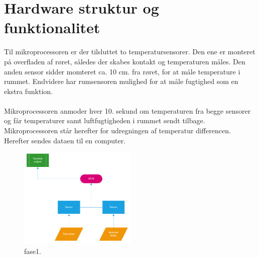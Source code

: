 \section{Hardware struktur og funktionalitet}
Til mikroprocessoren er der tilsluttet to  temperatursensorer. Den ene er monteret på overfladen af røret, således der skabes kontakt og temperaturen måles. Den anden sensor sidder momteret ca. 10 cm. fra røret, for at måle temperature i rummet. Endvidere har rumsensoren mulighed for at måle fugtighed som en ekstra funktion.
\\
\\
Mikroprocessoren anmoder hver 10. sekund om temperaturen fra begge sensorer og får temperaturer samt luftfugtigheden i rummet sendt tilbage. 
Mikroprocessoren står herefter for udregningen af temperatur differencen. Herefter
sendes dataen til en computer.\newline

\begin{figure}[h!]
  \caption{fase1.}
  \centering
  \includegraphics[width=0.5\textwidth]{figures/Phase1.PNG}
\end{figure}








